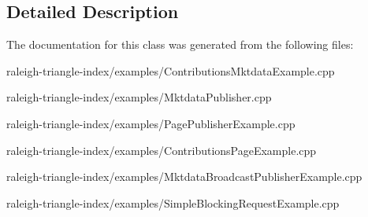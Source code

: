 \subsection{Detailed Description}


The documentation for this class was generated from the following files\+:\begin{DoxyCompactItemize}
\item 
raleigh-\/triangle-\/index/examples/Contributions\+Mktdata\+Example.\+cpp\item 
raleigh-\/triangle-\/index/examples/Mktdata\+Publisher.\+cpp\item 
raleigh-\/triangle-\/index/examples/Page\+Publisher\+Example.\+cpp\item 
raleigh-\/triangle-\/index/examples/Contributions\+Page\+Example.\+cpp\item 
raleigh-\/triangle-\/index/examples/Mktdata\+Broadcast\+Publisher\+Example.\+cpp\item 
raleigh-\/triangle-\/index/examples/Simple\+Blocking\+Request\+Example.\+cpp\end{DoxyCompactItemize}
